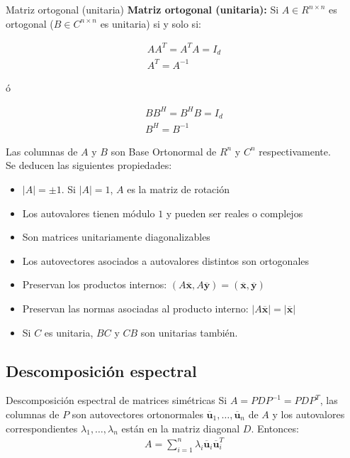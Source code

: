 \documentclass[a4paper, twoside]{article}
\numberwithin{equation}{section}
\numberwithin{figure}{section}
\numberwithin{table}{section}
\newcommand{\vect}[1]{\overline{\textbf{#1}}}
\newcommand{\dete}[1]{\left\vert #1 \right\vert}
\newcommand{\produ}[1]{(#1)}
\begin{document}
\begin{definicion*}{Matriz ortogonal (unitaria)}
		\textbf{Matriz ortogonal (unitaria):} Si $A \in R^{n \times n}$ es ortogonal ($B \in C^{n \times n}$ es unitaria) si y solo si:\\
	
	\begin{minipage}{0.4\textwidth}
		\begin{align}
			A A^T=A^T A=I_d \\
			A^T=A^{-1}
		\end{align}
	\end{minipage}
	\begin{minipage}{0.1\textwidth}
		\begin{flushright}
			ó
		\end{flushright}
	\end{minipage}
	\begin{minipage}{0.4\textwidth}
		\begin{align}
			B B^H=B^H B=I_d \\
			B^H=B^{-1}
		\end{align}
	\end{minipage}
	\vspace{0.5cm}
	Las columnas de $A$ y $B$ son Base Ortonormal de $R^n$ y $C^n$ respectivamente.\\
	
	Se deducen las siguientes propiedades:
	\begin{itemize}
		\item $\dete{A}=\pm 1$. Si $\dete{A}=1$, $A$ es la matriz de rotación
		\item Los autovalores tienen módulo $1$ y pueden ser reales o complejos
		\item Son matrices unitariamente diagonalizables
		\item Los autovectores asociados a autovalores distintos son ortogonales
		\item Preservan los productos internos: $\produ{A\vect{x},A\vect{y}}=\produ{\vect{x},\vect{y}}$
		\item Preservan las normas asociadas al producto interno: $\vert A \vect{x} \vert= \vert \vect{x} \vert$
		\item Si $C$ es unitaria, $BC$ y $CB$ son unitarias también.
	\end{itemize}
\end{definicion*}

\subsection{Descomposición espectral}
\begin{definicion*}{Descomposición espectral de matrices simétricas}
	Si $A=PDP^{-1}=PDP^T$, las columnas de $P$ son autovectores ortonormales $\vect{u}_1,\ldots,\vect{u}_n$ de $A$ y los autovalores correspondientes $\lambda_1,\ldots,\lambda_n$ están en la matriz diagonal $D$. Entonces:
	\begin{align}
		A=\sum_{i=1}^n \lambda_i\vect{u}_i \vect{u}_i^T
	\end{align}
\end{definicion*}
\end{document}
